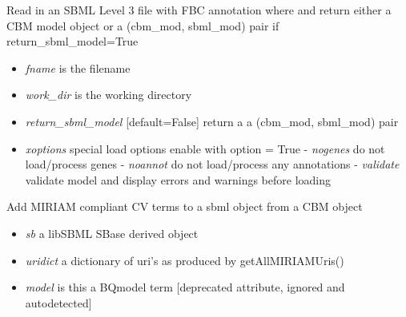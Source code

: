 \documentclass[a4paper,11pt,english]{sphinxmanual}
\begin{document}
\begin{fulllineitems}
\label{modules_doc:cbmpy.CBXML.sbml_readSBML3FBC}
Read in an SBML Level 3 file with FBC annotation where and return either a CBM model object
or a (cbm\_mod, sbml\_mod) pair if return\_sbml\_model=True
\begin{itemize}
\item {} 
\emph{fname} is the filename

\item {} 
\emph{work\_dir} is the working directory

\item {} 
\emph{return\_sbml\_model} {[}default=False{]} return a a (cbm\_mod, sbml\_mod) pair

\item {} 
\emph{xoptions} special load options enable with option = True
- \emph{nogenes} do not load/process genes
- \emph{noannot} do not load/process any annotations
- \emph{validate} validate model and display errors and warnings before loading

\end{itemize}

\end{fulllineitems}


\begin{fulllineitems}
\label{modules_doc:cbmpy.CBXML.sbml_setCVterms}
Add MIRIAM compliant CV terms to a sbml object from a CBM object
\begin{itemize}
\item {} 
\emph{sb} a libSBML SBase derived object

\item {} 
\emph{uridict} a dictionary of uri's as produced by getAllMIRIAMUris()

\item {} 
\emph{model} is this a BQmodel term {[}deprecated attribute, ignored and autodetected{]}

\end{itemize}

\end{fulllineitems}

\end{document}
